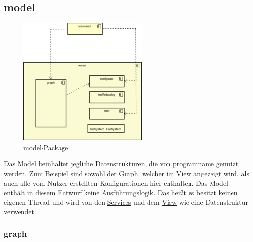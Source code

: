 \subsection{model}
\label{subsec:model}

\begin{figure}[H]
  \centering
  \includegraphics[width=\textwidth]{../diagramimages/model.png}
  \caption{model-Package}
\end{figure}

\medskip
Das Model beinhaltet jegliche Datenstrukturen, die von \gls{programname} genutzt
werden. Zum Beispiel sind sowohl der Graph, welcher im View angezeigt wird,
als auch alle vom Nutzer erstellten Konfigurationen hier enthalten. Das Model enthält in diesem Entwurf keine Ausführungslogik.
Das heißt es besitzt keinen eigenen Thread und wird von den
\hyperref[subsec:service]{Services} und dem \hyperref[subsec:view]{View} wie eine Datenstruktur verwendet.

    \subsubsection{graph}
    \label{subsubsec:graph}

